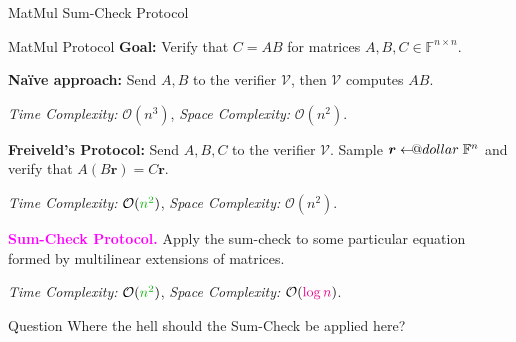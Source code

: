 \documentclass{zkdl-presentation-template}
\makeatletter
\newcommand\leftarrowS{\leftarrow\joinrel\smalldollar}
\newcommand{\smalldollar}{\mathrel{\mathpalette\small@dollar\relax}}
\newcommand{\small@dollar}[2]{%
  \vcenter{\hbox{%
    $#1\textnormal{\fontsize{0.7\dimexpr\f@size pt}{0}\selectfont\$}$%
  }}%
}
\makeatother
\begin{document}
    \begin{frame}{MatMul Sum-Check Protocol}
        \begin{block}{MatMul Protocol}
            \textbf{Goal:} Verify that $C=AB$ for matrices $A,B,C \in
            \mathbb{F}^{n \times n}$.\pause
        \end{block}

        \textcolor{blue!70!black}{\textbf{Naïve approach:}} Send $A,B$ to 
        the verifier $\mathcal{V}$, then $\mathcal{V}$ computes $AB$. \pause

        \textcolor{gray!80!black}{\textit{Time Complexity:} $\mathcal{O}(n^3)$, \textit{Space Complexity:}
        $\mathcal{O}(n^2)$.}\pause

        \textcolor{green!70!black}{\textbf{Freiveld's Protocol:}} Send $A,B,C$
        to the verifier $\mathcal{V}$. Sample $\boldsymbol{r} \leftarrowS
        \mathbb{F}^n$ and verify that $A(B\boldsymbol{r}) =
        C\boldsymbol{r}$.\pause

        \textcolor{gray!80!black}{\textit{Time Complexity:} $\mathcal{O}(\textcolor{green!70!black}{n^2})$, \textit{Space Complexity:}
        $\mathcal{O}(n^2)$.}\pause

        \textcolor{magenta}{\textbf{Sum-Check Protocol.}} Apply the sum-check to 
        some particular equation formed by multilinear extensions of matrices.\pause

        \textcolor{gray!80!black}{\textit{Time Complexity:} $\mathcal{O}(\textcolor{green!70!black}{n^2})$, \textit{Space Complexity:}
        $\mathcal{O}(\textcolor{magenta}{\log n})$.}\pause

        \begin{alertblock}{Question}
            Where the hell should the Sum-Check be applied here?
        \end{alertblock}
    \end{frame}
\end{document}
